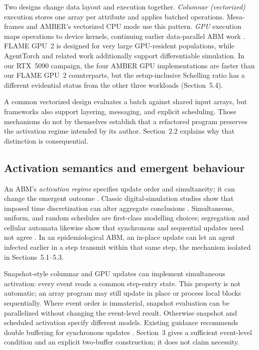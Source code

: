 \documentclass[sigconf,nonacm,review,natbib=true]{acmart}
\theoremstyle{definition}
\theoremstyle{plain}
\theoremstyle{remark}
\begin{document}
Two designs change data layout and execution together.
\emph{Columnar (vectorized)} execution stores one array per attribute and
applies batched operations. Mesa-frames \citep{mesaframes} and AMBER's
vectorized CPU mode use this pattern. \emph{GPU} execution maps operations to
device kernels, continuing earlier data-parallel ABM work
\citep{lysenko2008,richmond2010}. FLAME GPU~2
\citep{brayshaw2021,richmond2023} is designed for very large GPU-resident
populations, while AgentTorch and related work
\citep{chopra2023,chopra2025,querabofarull2023} additionally support
differentiable simulation. In our RTX~5090 campaign, the four AMBER GPU
implementations are faster than our FLAME GPU~2 counterparts, but the
setup-inclusive Schelling ratio has a different evidential status from the
other three workloads (Section~5.4).

A common vectorized design evaluates a batch against shared input arrays, but
frameworks also support layering, messaging, and explicit scheduling. Those
mechanisms do not by themselves establish that a refactored program preserves
the activation regime intended by its author. Section~2.2 explains why that
distinction is consequential.

\subsection{Activation semantics and emergent behaviour}

An ABM's \emph{activation regime} specifies update order and simultaneity; it
can change the emergent outcome
\citep{axtell2001,railsback2019,grimm2006,grimm2010}. Classic digital-simulation
studies show that imposed time discretization can alter aggregate conclusions
\citep{huberman1993}. Simultaneous, uniform, and random schedules are
first-class modelling choices; segregation and cellular automata likewise show
that synchronous and sequential updates need not agree
\citep{schelling1971,fates2014}. In an epidemiological ABM, an
in-place update can let an agent infected earlier in a step transmit within
that same step, the mechanism isolated in Sections~5.1--5.3.

Snapshot-style columnar and GPU updates can implement simultaneous activation:
every event reads a common step-entry state. This property is not automatic;
an array program may still update in place or process local blocks
sequentially. Where event order is immaterial, snapshot evaluation can be
parallelized without changing the event-level result. Otherwise snapshot and
scheduled activation specify different models. Existing guidance recommends
double buffering for synchronous updates \citep{railsback2019,grimm2010}.
Section~3 gives a sufficient event-level condition and an explicit two-buffer
construction; it does not claim necessity.
\end{document}
